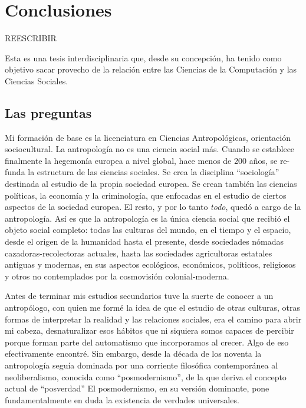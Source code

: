 \documentclass[a4paper,11pt]{book}
\theoremstyle{definition}
\begin{document}
\chapter{Conclusiones}



REESCRIBIR



Esta es una tesis interdisciplinaria que, desde su concepci\'on, ha tenido como objetivo sacar provecho de la relaci\'on entre las Ciencias de la Computaci\'on y las Ciencias Sociales.

%

\section{Las preguntas}

Mi formaci\'on de base es la licenciatura en Ciencias Antropol\'ogicas, orientaci\'on sociocultural.
%
La antropolog\'ia no es una ciencia social m\'as.
%
Cuando se establece finalmente la hegemon\'ia europea a nivel global, hace menos de 200 a\~nos, se re-funda la estructura de las ciencias sociales.
%
Se crea la disciplina ``sociolog\'ia'' destinada al estudio de la propia sociedad europea.
%
Se crean tambi\'en las ciencias pol\'iticas, la econom\'ia y la criminolog\'ia, que enfocadas en el estudio de ciertos aspectos de la sociedad europea.
%
El resto, y por lo tanto \emph{todo}, qued\'o a cargo de la antropolog\'ia.
%
As\'i es que la antropolog\'ia es la \'unica ciencia social que recibi\'o el objeto social completo: todas las culturas del mundo, en el tiempo y el espacio, desde el origen de la humanidad hasta el presente, desde sociedades n\'omadas cazadoras-recolectoras actuales, hasta las sociedades agricultoras estatales antiguas y modernas, en sus aspectos ecol\'ogicos, econ\'omicos, pol\'iticos, religiosos y otros no contemplados por la cosmovisi\'on colonial-moderna.


Antes de terminar mis estudios secundarios tuve la suerte de conocer a un antrop\'ologo, con quien me form\'e la idea de que el estudio de otras culturas, otras formas de interpretar la realidad y las relaciones sociales, era el camino para abrir mi cabeza, desnaturalizar esos h\'abitos que ni siquiera somos capaces de percibir porque forman parte del automatismo que incorporamos al crecer.
%
Algo de eso efectivamente encontr\'e.
%
Sin embargo, desde la d\'ecada de los noventa la antropolog\'ia segu\'ia dominada por una corriente filos\'ofica contempor\'anea al neoliberalismo, conocida como ``posmodernismo'', de la que deriva el concepto actual de ``posverdad''
%
El posmodernismo, en su versi\'on dominante, pone fundamentalmente en duda la existencia de verdades universales.
\end{document}

